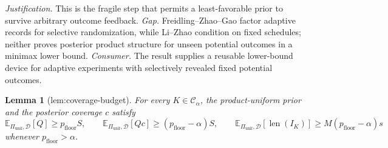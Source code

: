 \documentclass{article}
\newtheorem{lemma}{Lemma}
\begin{document}
\par\smallskip\noindent \textit{Justification.} This is the fragile step that permits a least-favorable prior to survive arbitrary outcome feedback. \textit{Gap.} Freidling--Zhao--Gao factor adaptive records for selective randomization, while Li--Zhao condition on fixed schedules; neither proves posterior product structure for unseen potential outcomes in a minimax lower bound. \textit{Consumer.} The result supplies a reusable lower-bound device for adaptive experiments with selectively revealed fixed potential outcomes.

\begin{lemma}[lem:coverage-budget]\label{lem:coverage-budget}
For every \(K\in\mathcal C_\alpha\), the product-uniform prior and the posterior coverage \(c\) satisfy \[\mathbb E_{\Pi_{\mathrm{unif}},\mathcal D}[Q]\ge p_{\mathrm{floor}}S,\qquad \mathbb E_{\Pi_{\mathrm{unif}},\mathcal D}[Qc]\ge(p_{\mathrm{floor}}-\alpha)S,\qquad \mathbb E_{\Pi_{\mathrm{unif}},\mathcal D}[\operatorname{len}(I_K)]\ge M(p_{\mathrm{floor}}-\alpha)s\] whenever \(p_{\mathrm{floor}}>\alpha\).
\end{lemma}
\end{document}
